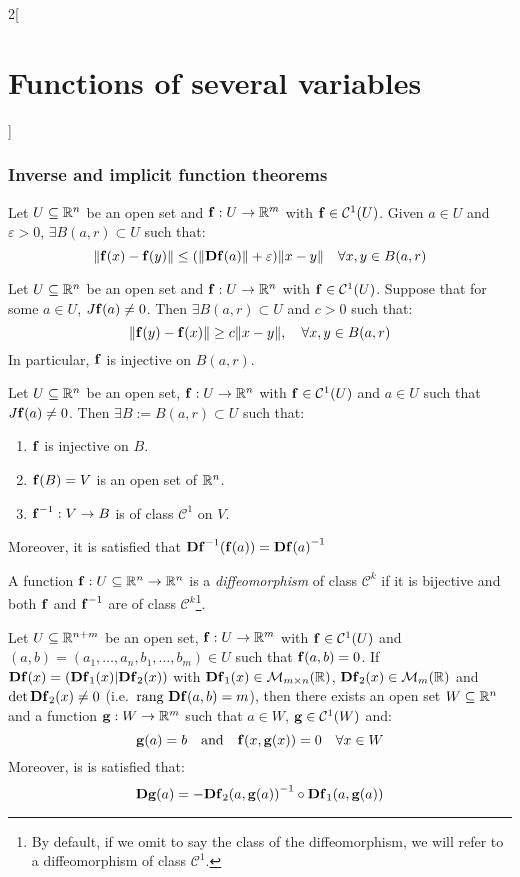 \documentclass[../../../main.tex]{subfiles}
\begin{document}
\begin{multicols}{2}[\section{Functions of several variables}]
  \subsubsection{Inverse and implicit function theorems}
  \begin{lemma}
    Let $U\subseteq\mathbb{R}^n$ be an open set and $\boldsymbol{\mathrm{f}}:U\rightarrow\mathbb{R}^m$ with $\boldsymbol{\mathrm{f}}\in \mathcal{C}^1(U)$. Given $a\in U$ and $\varepsilon>0$, $\exists B(a,r)\subset U$ such that: $$\|\boldsymbol{\mathrm{f}}(x)-\boldsymbol{\mathrm{f}}(y)\|\leq(\|\boldsymbol{\mathrm{Df}}(a)\|+\varepsilon)\|x-y\|\quad\forall x,y\in B(a,r)$$
  \end{lemma}
  \begin{lemma}
    Let $U\subseteq\mathbb{R}^n$ be an open set and $\boldsymbol{\mathrm{f}}:U\rightarrow\mathbb{R}^n$ with $\boldsymbol{\mathrm{f}}\in \mathcal{C}^1(U)$. Suppose that for some $a\in U$, $J\boldsymbol{\mathrm{f}}(a)\ne 0$. Then $\exists B(a,r)\subset U$ and $c>0$ such that: $$\|\boldsymbol{\mathrm{f}}(y)-\boldsymbol{\mathrm{f}}(x)\|\geq c\|x-y\|,\quad\forall x,y\in B(a,r)$$ In particular, $\boldsymbol{\mathrm{f}}$ is injective on $B(a,r)$.
  \end{lemma}
  \begin{theorem}
    Let $U\subseteq\mathbb{R}^n$ be an open set, $\boldsymbol{\mathrm{f}}:U\rightarrow\mathbb{R}^n$ with $\boldsymbol{\mathrm{f}}\in \mathcal{C}^1(U)$ and $a\in U$ such that $J\boldsymbol{\mathrm{f}}(a)\ne0$. Then $\exists B:=B(a,r)\subset U$ such that:
    \begin{enumerate}
      \item $\boldsymbol{\mathrm{f}}$ is injective on $B$.
      \item $\boldsymbol{\mathrm{f}}(B)=V$ is an open set of $\mathbb{R}^n$.
      \item $\boldsymbol{\mathrm{f}}^{-1}:V\rightarrow B$ is of class $\mathcal{C}^1$ on $V$.
    \end{enumerate} Moreover, it is satisfied that $\boldsymbol{\mathrm{D}}{\boldsymbol{\mathrm{f}}}^{-1}(\boldsymbol{\mathrm{f}}(a))={\boldsymbol{\mathrm{Df}}(a)}^{-1}$
  \end{theorem}
  \begin{definition}
    A function $\boldsymbol{\mathrm{f}}:U\subseteq\mathbb{R}^n\rightarrow\mathbb{R}^n$ is a \emph{diffeomorphism} of class $\mathcal{C}^k$ if it is bijective and both $\boldsymbol{\mathrm{f}}$ and $\boldsymbol{\mathrm{f}}^{-1}$ are of class $\mathcal{C}^k$\footnote{By default, if we omit to say the class of the diffeomorphism, we will refer to a diffeomorphism of class $\mathcal{C}^1$.}.
  \end{definition}
  \begin{theorem}
    Let $U\subseteq\mathbb{R}^{n+m}$ be an open set, $\boldsymbol{\mathrm{f}}:U\rightarrow\mathbb{R}^m$ with $\boldsymbol{\mathrm{f}}\in \mathcal{C}^1(U)$ and $(a,b)=(a_1,\ldots,a_n,b_1,\ldots,b_m)\in U$ such that $\boldsymbol{\mathrm{f}}(a,b)=0$. If $\boldsymbol{\mathrm{D}}\boldsymbol{\mathrm{f}}(x)=(\boldsymbol{\mathrm{D}}\boldsymbol{\mathrm{f}}_1(x)|\boldsymbol{\mathrm{D}}\boldsymbol{\mathrm{f}}_2(x))$ with $\boldsymbol{\mathrm{D}}\boldsymbol{\mathrm{f}}_1(x)\in\mathcal{M}_{m\times n}(\mathbb{R} )$, $\boldsymbol{\mathrm{D}}\boldsymbol{\mathrm{f}}_2(x)\in\mathcal{M}_m(\mathbb{R} )$ and $\det \boldsymbol{\mathrm{Df}}_2(x)\ne 0$ (i.e.\ $\text{rang }\boldsymbol{\mathrm{Df}}(a,b)=m$), then there exists an open set $W\subseteq\mathbb{R}^n$ and a function $\boldsymbol{\mathrm{g}}:W\rightarrow\mathbb{R}^m$ such that $a\in W$, $\boldsymbol{\mathrm{g}}\in\mathcal{C}^1(W)$ and: $$\boldsymbol{\mathrm{g}}(a)=b\quad\text{and}\quad \boldsymbol{\mathrm{f}}(x,\boldsymbol{\mathrm{g}}(x))=0\quad\forall x\in W$$ Moreover, is is satisfied that: $$\boldsymbol{\mathrm{Dg}}(a)=-{\boldsymbol{\mathrm{Df}}_2(a,\boldsymbol{\mathrm{g}}(a))}^{-1}\circ \boldsymbol{\mathrm{Df}}_1(a,\boldsymbol{\mathrm{g}}(a))$$
  \end{theorem}

\end{multicols}
\end{document}
